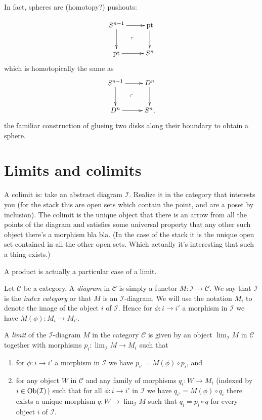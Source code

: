 In fact, spheres are (homotopy?) pushouts:

$$
\xymatrix{
S^{n-1}\ar[r]\ar[d]\ar@{}[dr]|-{\ulcorner}&
\text{pt}\ar[d]\\
\text{pt}\ar[r]&S^n
}
$$
which is homotopically the same as
$$
\xymatrix{
S^{n-1}\ar[r]\ar[d]\ar@{}[dr]|-{\ulcorner}&
D^n\ar[d]\\
D^n\ar[r]&S^n,
}
$$
the familiar construction of glueing two
disks along their boundary to obtain a
sphere.


\section{Limits and colimits}
\label{section-limits-and-colimits}

\noindent
A colimit is:
take an abstract diagram $\mathcal{I}$.
Realize it in the category that interests you
(for the stack this are open sets which
contain the point,
and are a poset by inclusion).
The colimit is the unique object that
there is an arrow from all the points of the
diagram
and satisfies some universal property that
any other such object there's a morphism bla
bla.
(In the case of the stack it is the unique
open set contained in all the other open
sets.
Which actually it's interesting that such a
thing
exists.)

\noindent
A product is actually a particular case of a
limit.

\medskip\noindent
Let $\mathcal{C}$ be a category. A {\it
diagram} in $\mathcal{C}$ is
simply a functor $M : \mathcal{I} \to
\mathcal{C}$. We say that
$\mathcal{I}$ is the {\it index category} or
that $M$ is an
$\mathcal{I}$-diagram. We will use the
notation $M_i$ to denote the
image of the object
$i$ of $\mathcal{I}$. Hence for $\phi : i \to
i'$ a morphism
in $\mathcal{I}$ we have $M(\phi) : M_i \to
M_{i'}$.

\begin{definition}
\label{definition-limit}
A {\it limit} of the $\mathcal{I}$-diagram
$M$ in the category
$\mathcal{C}$ is given by an object
$\lim_\mathcal{I} M$ in $\mathcal{C}$
together with morphisms $p_i :
\lim_\mathcal{I} M \to M_i$ such that
\begin{enumerate}
\item for $\phi : i \to i'$ a morphism
in $\mathcal{I}$ we have $p_{i'} = M(\phi)
\circ p_i$, and
\item for any object $W$ in $\mathcal{C}$ and
any family of
morphisms $q_i : W \to M_i$ (indexed by $i
\in \mathop{\mathrm{Ob}}\nolimits(\mathcal{I})$)
such that for all $\phi : i \to i'$
in $\mathcal{I}$ we have $q_{i'} = M(\phi)
\circ q_i$ there
exists a unique morphism $q : W \to
\lim_\mathcal{I} M$ such that
$q_i = p_i \circ q$ for every object $i$ of
$\mathcal{I}$.
\end{enumerate}
\end{definition}

